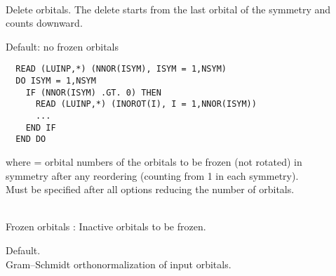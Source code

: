\begin{description}
\item[]
   \\
  Delete orbitals. The delete starts from the
  last orbital of the symmetry and counts downward.

\item[]
  Default: no frozen orbitals
\begin{verbatim}
  READ (LUINP,*) (NNOR(ISYM), ISYM = 1,NSYM)
  DO ISYM = 1,NSYM
    IF (NNOR(ISYM) .GT. 0) THEN
      READ (LUINP,*) (INOROT(I), I = 1,NNOR(ISYM))
      ...
    END IF
  END DO
\end{verbatim}
  where  = orbital numbers of the orbitals to be
          frozen
          (not rotated) in symmetry 
          after any reordering (counting from 1 in each symmetry).\\
  Must be specified after all options reducing the number of orbitals.

\item[]
   \\
  Frozen orbitals : Inactive orbitals to be frozen.

\item[]
  Default.\\
  Gram--Schmidt orthonormalization of input orbitals.


\end{description}
